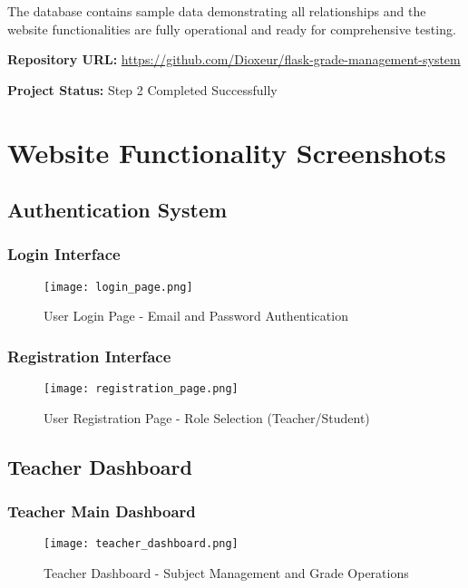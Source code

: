 \documentclass[12pt,a4paper]{article}
\begin{document}
The database contains sample data demonstrating all relationships and the website functionalities are fully operational and ready for comprehensive testing.

\vspace{1cm}

\noindent\textbf{Repository URL:} \url{https://github.com/Dioxeur/flask-grade-management-system}

\noindent\textbf{Project Status:} Step 2 Completed Successfully

\section{Website Functionality Screenshots}

\subsection{Authentication System}

\subsubsection{Login Interface}
\begin{figure}[h]
\centering
\texttt{[image: login\_page.png]}
\caption{User Login Page - Email and Password Authentication}
\label{fig:login}
\end{figure}

\subsubsection{Registration Interface}
\begin{figure}[h]
\centering
\texttt{[image: registration\_page.png]}
\caption{User Registration Page - Role Selection (Teacher/Student)}
\label{fig:registration}
\end{figure}

\subsection{Teacher Dashboard}

\subsubsection{Teacher Main Dashboard}
\begin{figure}[h]
\centering
\texttt{[image: teacher\_dashboard.png]}
\caption{Teacher Dashboard - Subject Management and Grade Operations}
\label{fig:teacher_dash}
\end{figure}
\end{document}
